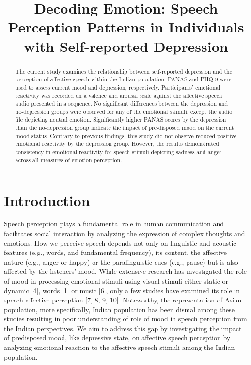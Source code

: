 \documentclass{Interspeech2024}
\title{Decoding Emotion: Speech Perception Patterns in Individuals with Self-reported Depression}
\begin{document}
\maketitle

\begin{abstract}
    
The current study examines the relationship between self-reported depression and the perception of affective speech within the Indian population. PANAS and PHQ-9 were used to assess current mood and depression, respectively. Participants' emotional reactivity was recorded on a valence and arousal scale against the affective speech audio presented in a sequence. No significant differences between the depression and no-depression groups were observed for any of the emotional stimuli, except the audio file depicting neutral emotion. Significantly higher PANAS scores by the depression than the no-depression group indicate the impact of pre-disposed mood on the current mood status. Contrary to previous findings, this study did not observe reduced positive emotional reactivity by the depression group. However, the results demonstrated consistency in emotional reactivity for speech stimuli depicting sadness and anger across all measures of emotion perception.  


\end{abstract}

\section{Introduction}

Speech perception plays a fundamental role in human communication and facilitates social interaction by analyzing the expression of complex thoughts and emotions. How we perceive speech depends not only on linguistic and acoustic features (e.g., words, and fundamental frequency), its content, the affective nature (e.g., anger or happy) or the paralinguistic cues (e.g., pause) but is also affected by the listeners’ mood. While extensive research has investigated the role of mood in processing emotional stimuli using visual stimuli either static or dynamic [4], words [1] or music [6], only a few studies have examined its role in speech affective perception [7, 8, 9, 10]. Noteworthy, the representation of Asian population, more specifically, Indian population has been dismal among these studies \cite{uekermann2008perception, peron2011major, punkanen2011biased} resulting in poor understanding of role of mood in speech perception from the Indian perspectives. We aim to address this gap by investigating the impact of predisposed mood, like depressive state, on affective speech perception by analyzing emotional reaction to the affective speech stimuli among the Indian population.
\end{document}
